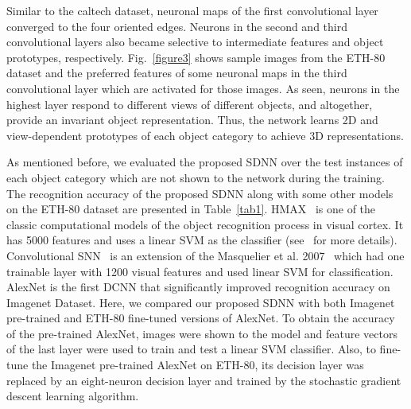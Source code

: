 \documentclass[preprint,5p,12pt,twocolumn]{article}
\begin{document}
Similar to the caltech dataset, neuronal maps of the first convolutional layer converged to the four oriented edges. Neurons in the second and third convolutional layers also became selective to intermediate features and object prototypes, respectively. Fig.~\ref{figure3}  shows sample images from the ETH-80 dataset and the preferred features of some neuronal maps in the  third convolutional layer which are activated for those images. As seen, neurons in the highest layer respond to different views of different objects, and altogether, provide an invariant object representation. Thus, the network learns  2D and view-dependent prototypes of each object category to achieve 3D representations.


As mentioned before, we evaluated the proposed SDNN over the test instances of each object category which are not shown to the network during the training. The recognition accuracy of the proposed SDNN along with some other models on the ETH-80 dataset are presented in Table~\ref{tab1}. HMAX~\cite{serre2007feedforward} is one of the classic computational models of the object recognition process in visual cortex. It has 5000 features and uses a linear SVM as the classifier (see~\cite{kheradpisheh2016bio} for more details). Convolutional SNN~\cite{kheradpisheh2016bio} is an extension of the Masquelier et al. 2007~\cite{masquelier2007unsupervised} which had  one trainable layer with 1200 visual features and used linear SVM for classification. AlexNet is the first DCNN that significantly improved recognition accuracy on Imagenet Dataset. Here, we compared our proposed SDNN with both Imagenet pre-trained and ETH-80 fine-tuned versions of AlexNet. To obtain the accuracy of the pre-trained AlexNet, images were shown to the model and feature vectors of the last layer were used to train and test a linear SVM classifier. Also, to fine-tune the Imagenet pre-trained AlexNet on ETH-80, its decision layer was replaced by an eight-neuron decision layer and trained by the stochastic gradient descent learning algorithm.
\end{document}
